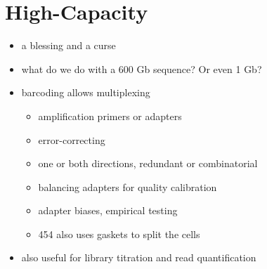 \documentclass{article}
\begin{document}
    \section{High-Capacity}
        \begin{itemize}
            \item a blessing and a curse
            \item what do we do with a 600 Gb sequence?  Or even 1 Gb?
            \item barcoding allows multiplexing
            \begin{itemize}
                \item amplification primers or adapters
                \item error-correcting
                \item one or both directions, redundant or combinatorial
                \item balancing adapters for quality calibration
                \item adapter biases, empirical testing
                \item 454 also uses gaskets to split the cells
            \end{itemize}
            \item also useful for library titration and read quantification
        \end{itemize}
\end{document}
